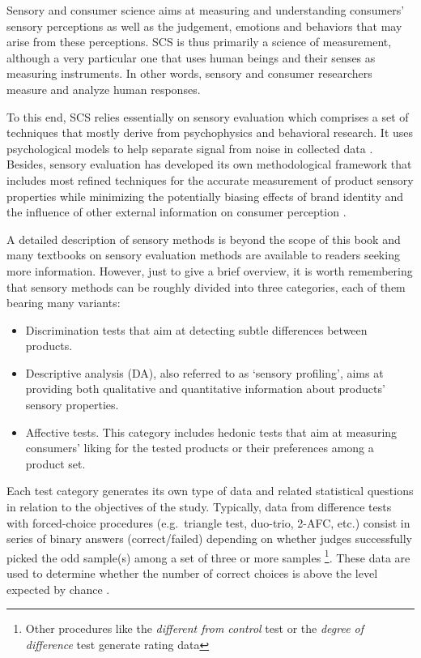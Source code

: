 \documentclass[
]{krantz}
\providecommand{\tightlist}{%
  \setlength{\itemsep}{0pt}\setlength{\parskip}{0pt}}
\begin{document}
Sensory and consumer science aims at measuring and understanding consumers' sensory perceptions as well as the judgement, emotions and behaviors that may arise from these perceptions. SCS is thus primarily a science of measurement, although a very particular one that uses human beings and their senses as measuring instruments. In other words, sensory and consumer researchers measure and analyze human responses.

To this end, SCS relies essentially on sensory evaluation which comprises a set of techniques that mostly derive from psychophysics and behavioral research. It uses psychological models to help separate signal from noise in collected data \citep{lee2004, Ennis2016Thurstonian}. Besides, sensory evaluation has developed its own methodological framework that includes most refined techniques for the accurate measurement of product sensory properties while minimizing the potentially biasing effects of brand identity and the influence of other external information on consumer perception \citep{LawlessHeym2010}.

A detailed description of sensory methods is beyond the scope of this book and many textbooks on sensory evaluation methods are available to readers seeking more information. However, just to give a brief overview, it is worth remembering that sensory methods can be roughly divided into three categories, each of them bearing many variants:

\begin{itemize}
\tightlist
\item
  Discrimination tests that aim at detecting subtle differences between products.
\item
  Descriptive analysis (DA), also referred to as `sensory profiling', aims at providing both qualitative and quantitative information about products' sensory properties.
\item
  Affective tests. This category includes hedonic tests that aim at measuring consumers' liking for the tested products or their preferences among a product set.
\end{itemize}

Each test category generates its own type of data and related statistical questions in relation to the objectives of the study. Typically, data from difference tests with forced-choice procedures (e.g.~triangle test, duo-trio, 2-AFC, etc.) consist in series of binary answers (correct/failed) depending on whether judges successfully picked the odd sample(s) among a set of three or more samples \footnote{Other procedures like the \emph{different from control} test or the \emph{degree of difference} test generate rating data}. These data are used to determine whether the number of correct choices is above the level expected by chance \citep[see][ for an overview of these methods, the related theories and experimental factors]{OMahonyRousseau2003}.
\end{document}

